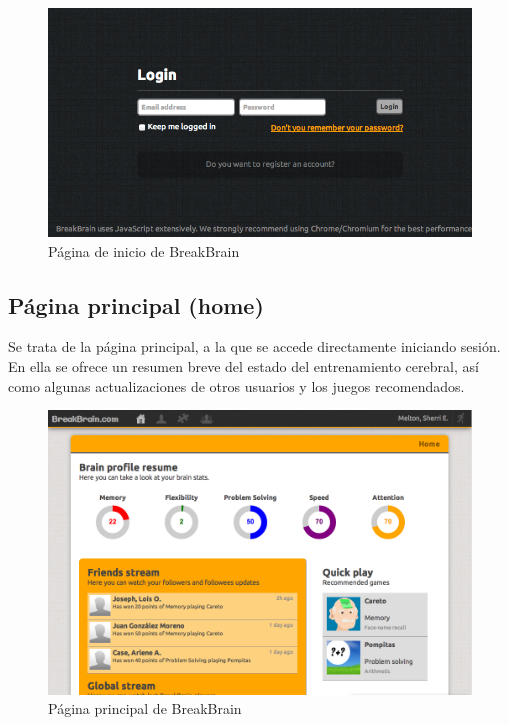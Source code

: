 \begin{figure}[h]
  \begin{center}
    \includegraphics[width=\textwidth]{./images/page-login.png}
  \end{center}  
  \caption{Página de inicio de BreakBrain}
  \label{fig::page-login}
\end{figure}

\subsection{Página principal (home)}

Se trata de la página principal, a la que se accede directamente iniciando sesión. En ella se ofrece un resumen breve del estado del entrenamiento cerebral, así como algunas actualizaciones de otros usuarios y los juegos recomendados.

\begin{figure}[h]
  \begin{center}
    \includegraphics[width=\textwidth]{./images/page-home.png}
  \end{center}  
  \caption{Página principal de BreakBrain}
  \label{fig::page-home}
\end{figure}

